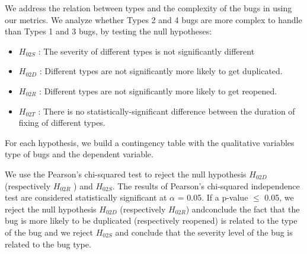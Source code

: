 We address the relation between types and the complexity of the bugs in using our metrics.
We analyze whether Types 2 and 4 bugs are more complex to handle than Types 1 and 3 bugs, by testing the null hypotheses:

\begin{itemize}
 \item  $H_{02S}$ : The severity of different types is not significantly different
 \item  $H_{02D}$ : Different types are not significantly more likely to get duplicated.
 \item  $H_{02R}$ : Different types are not significantly more likely to get reopened.
 \item $H_{02T}$ : There is no statistically-significant difference
between the duration of fixing of different types.
\end{itemize}

For each hypothesis, we build a contingency table with the qualitative variables type of bugs and the dependent variable.

We use the Pearson's chi-squared test to reject the null
hypothesis $H_{02D}$ (respectively $H_{02R}$ ) and $H_{02S}$. The results of Pearson's chi-squared independence test are considered
statistically significant at $\alpha$ = 0.05.
If a p-value $\le$ 0.05, we reject the null hypothesis $H_{02D}$ (respectively $H_{02R}$) andconclude the fact that the bug is more likely to be duplicated (respectively reopened) is related to the type of the bug and we reject $H_{02S}$ and conclude that the severity level of the bug is related to the bug type.





